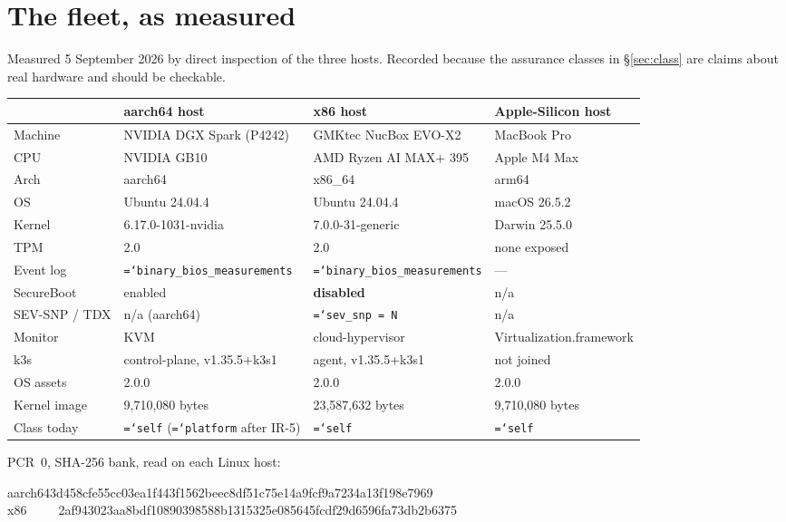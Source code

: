 \documentclass[11pt,a4paper]{article}
\newcommand{\code}[1]{\texttt{\hyphenchar\font=`\-\relax #1}}
\begin{document}
\appendix

\section{The fleet, as measured}
\label{app:fleet}

Measured 5 September 2026 by direct inspection of the three hosts. Recorded because
the assurance classes in \S\ref{sec:class} are claims about real hardware and
should be checkable.

\begin{center}
\footnotesize
\begin{tabular}{@{}llll@{}}
\toprule
& \textbf{aarch64 host} & \textbf{x86 host} & \textbf{Apple-Silicon host} \\
\midrule
Machine & NVIDIA DGX Spark (P4242) & GMKtec NucBox EVO-X2 & MacBook Pro \\
CPU & NVIDIA GB10 & AMD Ryzen AI MAX+ 395 & Apple M4 Max \\
Arch & aarch64 & x86\_64 & arm64 \\
OS & Ubuntu 24.04.4 & Ubuntu 24.04.4 & macOS 26.5.2 \\
Kernel & 6.17.0-1031-nvidia & 7.0.0-31-generic & Darwin 25.5.0 \\
TPM & 2.0 & 2.0 & none exposed \\
Event log & \code{binary\_bios\_measurements} & \code{binary\_bios\_measurements} & --- \\
SecureBoot & enabled & \textbf{disabled} & n/a \\
SEV-SNP / TDX & n/a (aarch64) & \code{sev\_snp = N} & n/a \\
Monitor & KVM & cloud-hypervisor & Virtualization.framework \\
k3s & control-plane, v1.35.5+k3s1 & agent, v1.35.5+k3s1 & not joined \\
OS assets & 2.0.0 & 2.0.0 & 2.0.0 \\
Kernel image & 9,710,080 bytes & 23,587,632 bytes & 9,710,080 bytes \\
Class today & \code{self} (\code{platform} after IR-5) & \code{self} & \code{self} \\
\bottomrule
\end{tabular}
\end{center}

\noindent
PCR~0, SHA-256 bank, read on each Linux host:

\begin{center}\small\ttfamily
aarch64\quad 3d458cfe55cc03ea1f443f1562beec8df51c75e14a9fcf9a7234a13f198e7969\\
x86\quad\ \ \ \ \ 2af943023aa8bdf10890398588b1315325e085645fcdf29d6596fa73db2b6375
\end{center}
\end{document}
